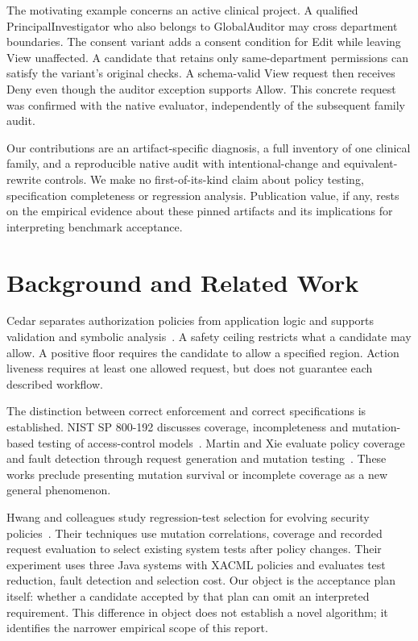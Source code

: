 \documentclass[sigconf,nonacm]{acmart}
\begin{document}
The motivating example concerns an active clinical project. A qualified PrincipalInvestigator who also belongs to GlobalAuditor may cross department boundaries. The consent variant adds a consent condition for Edit while leaving View unaffected. A candidate that retains only same-department permissions can satisfy the variant's original checks. A schema-valid View request then receives Deny even though the auditor exception supports Allow. This concrete request was confirmed with the native evaluator, independently of the subsequent family audit.

Our contributions are an artifact-specific diagnosis, a full inventory of one clinical family, and a reproducible native audit with intentional-change and equivalent-rewrite controls. We make no first-of-its-kind claim about policy testing, specification completeness or regression analysis. Publication value, if any, rests on the empirical evidence about these pinned artifacts and its implications for interpreting benchmark acceptance.

\section{Background and Related Work}
Cedar separates authorization policies from application logic and supports validation and symbolic analysis~\cite{cedar}. A safety ceiling restricts what a candidate may allow. A positive floor requires the candidate to allow a specified region. Action liveness requires at least one allowed request, but does not guarantee each described workflow.

The distinction between correct enforcement and correct specifications is established. NIST SP 800-192 discusses coverage, incompleteness and mutation-based testing of access-control models~\cite{nist}. Martin and Xie evaluate policy coverage and fault detection through request generation and mutation testing~\cite{martin}. These works preclude presenting mutation survival or incomplete coverage as a new general phenomenon.

Hwang and colleagues study regression-test selection for evolving security policies~\cite{hwang}. Their techniques use mutation correlations, coverage and recorded request evaluation to select existing system tests after policy changes. Their experiment uses three Java systems with XACML policies and evaluates test reduction, fault detection and selection cost. Our object is the acceptance plan itself: whether a candidate accepted by that plan can omit an interpreted requirement. This difference in object does not establish a novel algorithm; it identifies the narrower empirical scope of this report.
\end{document}
